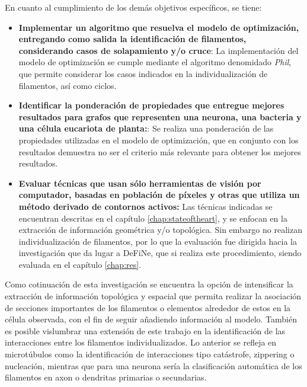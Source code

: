 En cuanto al cumplimiento de los dem\'as objetivos espec\'ificos, se tiene:
\begin{itemize}
    \item {\bf Implementar un algoritmo que resuelva el modelo de optimizaci\'on, entregando como salida la identificaci\'on de filamentos, considerando casos de solapamiento y/o cruce}: La implementaci\'on del modelo de optimizaci\'on se cumple mediante el algoritmo denomidado {\it Phil}, que permite considerar los casos indicados en la individualizaci\'on de filamentos, as\'i como ciclos.
    
    \item {\bf Identificar la ponderaci\'on de propiedades que entregue mejores resultados para grafos que representen una neurona, una bacteria y una c\'elula eucariota de planta:}: Se realiza una ponderaci\'on de las propiedades utilizadas en el modelo de 
    optimizaci\'on, que en conjunto con los resultados demuestra no ser el criterio m\'as relevante para obtener los mejores resultados.
    
    \item {\bf Evaluar t\'ecnicas que usan s\'olo herramientas de visi\'on por computador, basadas en poblaci\'on de p\'ixeles y otras que utiliza un m\'etodo derivado de contornos activos:} Las t\'ecnicas indicadas se encuentran descritas en el cap\'itulo \ref{chap:stateoftheart}, y se enfocan en la extracci\'on de informaci\'on geom\'etrica y/o topol\'ogica. Sin embargo no realizan individualizaci\'on de filamentos, por lo que la evaluaci\'on fue dirigida hacia la investigaci\'on que da lugar a DeFiNe, que si realiza este procedimiento, siendo evaluada en el cap\'itulo \ref{chap:res}.
\end{itemize}


Como cotinuaci\'on de esta investigaci\'on se encuentra la opci\'on de intensificar la extracci\'on de informaci\'on topol\'ogica y espacial que permita realizar la asociaci\'on de secciones importantes de los filamentos o elementos alrededor de estos en la c\'elula observada, con el fin de seguir a\~nadiendo informaci\'on al modelo. Tambi\'en es posible vislumbrar una extensi\'on de este trabajo en la identificaci\'on de las interacciones entre los filamentos individualizados. Lo anterior se refleja en microt\'ubulos como la identificaci\'on de interacciones tipo cat\'astrofe, zippering o nucleaci\'on, mientras que para una neurona ser\'ia la clasificaci\'on autom\'atica de los filamentos en axon o dendritas primarias o secundarias.